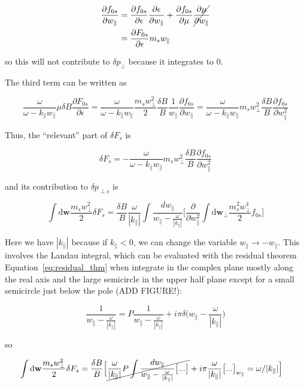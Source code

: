 \documentclass[
  notoc %
]{tufte-book}
\begin{document}
\[
\begin{aligned}
\frac{\partial f_{0s}}{\partial w_\parallel} &= \frac{\partial f_{0s}}{\partial \epsilon}\frac{\partial \epsilon}{\partial w_\parallel} + \frac{\partial f_{0s}}{\partial\mu}\cancel{\frac{\partial \mu}{\partial w_\parallel}} \\
&= \frac{\partial F_{0s}}{\partial\epsilon}m_s w_\parallel
\end{aligned}
\]

so this will not contribute to \(\delta p_\perp\) because it integrates
to 0.

The third term can be written as

\[
\frac{\omega}{\omega-k_\parallel w_\parallel}\mu\delta B\frac{\partial F_{0s}}{\partial\epsilon} = \frac{\omega}{\omega-k_\parallel w_\parallel}\frac{m_sw_\perp^2}{2}\frac{\delta B}{B}\frac{1}{w_\parallel}\frac{\partial f_{0s}}{\partial w_\parallel} = \frac{\omega}{\omega-k_\parallel w_\parallel} m_sw_\perp^2\frac{\delta B}{B}\frac{\partial f_{0s}}{\partial w_\parallel^2}
\]

Thus, the ``relevant'' part of \(\delta F_s\) is

\[
\delta F_s = -\frac{\omega}{\omega-k_\parallel w_\parallel} m_sw_\perp^2\frac{\delta B}{B}\frac{\partial f_{0s}}{\partial w_\parallel^2}
\]

and its contribution to \(\delta p_{\perp s}\) is

\[
\int \mathrm{d}\mathbf{w}\frac{m_sw_\perp^2}{2}\delta F_s = \frac{\delta B}{B}\frac{\omega}{|k_\parallel|}\int\frac{dw_\parallel}{w_\parallel - \frac{\omega}{|k_\parallel|}} \Big[ \frac{\partial}{\partial w_\parallel^2}\int \mathrm{d}\mathbf{w}_\perp \frac{m_s^2w_\perp^4}{2} f_{0s} \Big]
\]

Here we have \(|k_\parallel|\) because if \(k_\parallel <0\), we can
change the variable \(w_\parallel \rightarrow -w_\parallel\). This
involves the Landau integral, which can be evaluated with the residual
theorem Equation~\ref{eq:residual_thm} when integrate in the complex
plane mostly along the real axis and the large semicircle in the upper
half plane except for a small semicircle just below the pole (ADD
FIGURE!):

\[
\frac{1}{w_\parallel - \frac{\omega}{|k_\parallel|}} = P\frac{1}{w_\parallel - \frac{\omega}{|k_\parallel|}} + i\pi\delta\Big(w_\parallel - \frac{\omega}{|k_\parallel|} \Big)
\]

so

\[
\begin{aligned}
\int \mathrm{d}\mathbf{w}\frac{m_sw_\perp^2}{2}\delta F_s &= \frac{\delta B}{B}\Big[ \cancel{\frac{\omega}{|k_\parallel|}P\int\frac{dw_\parallel}{w_\parallel - \frac{\omega}{|k_\parallel|}} \big[ ... \big]} + i\pi\frac{\omega}{|k_\parallel|}\big[ ... \big]_{w_\parallel}=\omega/|k_\parallel| \Big]
\end{aligned}
\]
\end{document}
